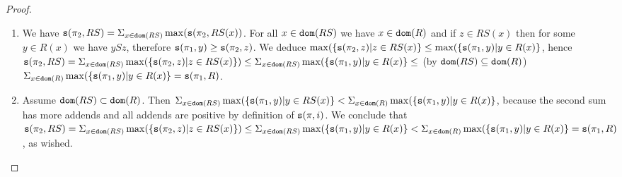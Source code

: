 \documentclass{lmcs}
\newtheorem{definition}[theorem]{Definition}
\begin{document}
\begin{proof}
\begin{enumerate}

\item
We have ${\tt s}(\pi_2, RS) =
\Sigma_{x \in {\tt dom}(RS)} \max({\tt s}(\pi_2, RS(x))$. For all $x \in {\tt dom}(RS)$ we have
$x \in {\tt dom}(R)$ and if $z \in RS(x)$ then for some $y \in R(x)$ we have $y S z$,
therefore ${\tt s}(\pi_1,y) \ge {\tt s}(\pi_2,z)$. We deduce 
$\max( \{ {\tt s}(\pi_2,z) | z \in RS(x) \}\le \max( \{ {\tt s}(\pi_1,y) | y \in R(x) \}$, 
hence 
$
{\tt s}(\pi_2, RS)                                                                                   =
\Sigma_{x \in {\tt dom}(RS)} \max( \{ {\tt s}(\pi_2,z) | z \in RS(x) \})     \le
\Sigma_{x \in {\tt dom}(RS)} \max( \{ {\tt s}(\pi_1,y) | y \in R(x) \}             \le
$
(by ${\tt dom}(RS) \subseteq {\tt dom}(R)$)
$
\Sigma_{x \in {\tt dom}(R)}   \max( \{ {\tt s}(\pi_1,y) | y \in R(x) \}             =
{\tt s}(\pi_1, R)
$.

\item
Assume ${\tt dom}(RS) \subset {\tt dom}(R)$.
Then 
$
\Sigma_{x \in {\tt dom}(RS)} \max( \{ {\tt s}(\pi_1,y) | y \in RS(x) \}           <
\Sigma_{x \in {\tt dom}(R)}   \max( \{ {\tt s}(\pi_1,y) | y \in R(x) \}
$, 
because the second sum has more addends and all addends are positive
by definition of ${\tt s}(\pi,i)$. We conclude that 
$
{\tt s}(\pi_2, RS)                                                                                    =
\Sigma_{x \in {\tt dom}(RS)} \max( \{ {\tt s}(\pi_2,z) | z \in RS(x) \})     \le
\Sigma_{x \in {\tt dom}(RS)} \max( \{ {\tt s}(\pi_1,y) | y \in R(x) \}              <
\Sigma_{x \in {\tt dom}(R)}   \max( \{ {\tt s}(\pi_1,y) | y \in R(x) \}              =
{\tt s}(\pi_1, R)
$, 
as wished.
\end{enumerate}
\end{proof}

%
%
%
%
\end{document}
